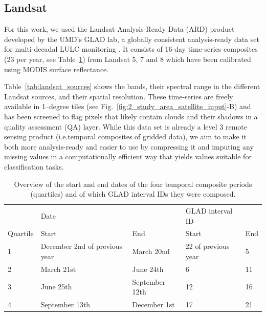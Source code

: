 \subsection*{Landsat}
For this work, we used the Landsat Analysis-Ready Data (ARD) product developed by the UMD's GLAD lab, a globally consistent analysis-ready data set for multi-decadal LULC monitoring \citep{potapov2020landsat}. It consists of 16-day time-series composites (23 per year, see Table~\ref{tab:quartiles}) from Landsat 5, 7 and 8 which have been calibrated using MODIS surface reflectance. 

Table~\ref{tab:landsat_sources} shows the bands, their spectral range in the different Landsat sources, and their spatial resolution. These time-series are freely available in 1--degree tiles (see Fig.\@~\ref{fig:2_study_area_satellite_input}-B) and has been screened to flag pixels that likely contain clouds and their shadows in a quality assessment (QA) layer. While this data set is already a level 3 remote sensing product (i.e.\@ temporal composites of gridded data), we aim to make it both more analysis-ready and easier to use by compressing it and imputing any missing values in a computationally efficient way that yields values suitable for classification tasks.

\begin{table}[]
\centering
\caption{Overview of the start and end dates of the four temporal composite periods (quartiles) and of which GLAD interval IDs they were composed.}
\label{tab:quartiles}
\begin{tabular}{@{}l|ll|ll@{}}
\hline
            & Date                          &                   & GLAD interval ID      &       \\
Quartile    & Start                         & End               & Start                 & End   \\
\hline
1           & December 2nd of previous year & March 20nd        & 22 of previous year   & 5   \\
2           & March 21st                    & June 24th         & 6                     & 11 \\
3           & June 25th                     & September 12th    & 12                    & 16 \\
4           & September 13th                & December 1st      & 17                    & 21 \\ 
\hline
\end{tabular}
\end{table}

